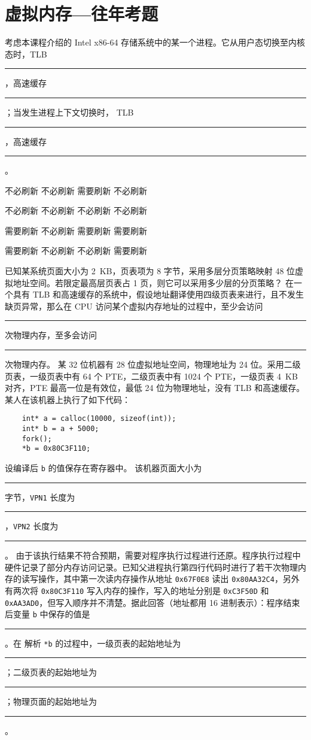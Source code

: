 \chapter{虚拟内存{---}往年考题}\thispagestyle{empty}
    \begin{problems}
         考虑本课程介绍的 Intel x86-64 存储系统中的某一个进程。它从用户态切换至内核态时，TLB \rule{2.5cm}{0.25mm}，高速缓存 \rule{2.5cm}{0.25mm}；当发生进程上下文切换时， TLB \rule{2.5cm}{0.25mm}，高速缓存 \rule{2.5cm}{0.25mm}。
        \begin{choices}
            \item 不必刷新 \quad 不必刷新 \quad 需要刷新 \quad 不必刷新
            \item 不必刷新 \quad 不必刷新 \quad 不必刷新 \quad 不必刷新
            \item 需要刷新 \quad 不必刷新 \quad 需要刷新 \quad 需要刷新
            \item 需要刷新 \quad 不必刷新 \quad 不必刷新 \quad 需要刷新
        \end{choices}
         已知某系统页面大小为 \SI{2}{KB}，页表项为 8 字节，采用多层分页策略映射 48 位虚拟地址空间。若限定最高层页表占 1 页，则它可以采用多少层的分页策略？
         在一个具有 TLB 和高速缓存的系统中，假设地址翻译使用四级页表来进行，且不发生缺页异常，那么在 CPU 访问某个虚拟内存地址的过程中，至少会访问 \rule{2.5cm}{0.25mm} 次物理内存，至多会访问 \rule{2.5cm}{0.25mm} 次物理内存。
         某 32 位机器有 28 位虚拟地址空间，物理地址为 24 位。采用二级页表，一级页表中有 64 个 PTE，二级页表中有 1024 个 PTE，一级页表 \SI{4}{KB} 对齐，PTE 最高一位是有效位，最低 24 位为物理地址，没有 TLB 和高速缓存。某人在该机器上执行了如下代码：
        \begin{verbatim}
    int* a = calloc(10000, sizeof(int));
    int* b = a + 5000;
    fork();
    *b = 0x80C3F110;
        \end{verbatim}
        设编译后 \verb|b| 的值保存在寄存器中。
        \qn 该机器页面大小为 \rule{2.5cm}{0.25mm} 字节，\verb|VPN1| 长度为 \rule{2.5cm}{0.25mm}，\verb|VPN2| 长度为 \rule{2.5cm}{0.25mm}。
        \qn 由于该执行结果不符合预期，需要对程序执行过程进行还原。程序执行过程中硬件记录了部分内存访问记录。已知父进程执行第四行代码时进行了若干次物理内存的读写操作，其中第一次读内存操作从地址 \verb|0x67F0E8| 读出 \verb|0x80AA32C4|，另外有两次将 \verb|0x80C3F110| 写入内存的操作，写入的地址分别是 \verb|0xC3F50D| 和 \verb|0xAA3AD0|，但写入顺序并不清楚。据此回答（地址都用 16 进制表示）：程序结束后变量 \verb|b| 中保存的值是\rule{2.5cm}{0.25mm}。在 解析 \verb|*b| 的过程中，一级页表的起始地址为 \rule{2.5cm}{0.25mm}；二级页表的起始地址为 \rule{2.5cm}{0.25mm}；物理页面的起始地址为 \rule{2.5cm}{0.25mm}。

\end{problems}

